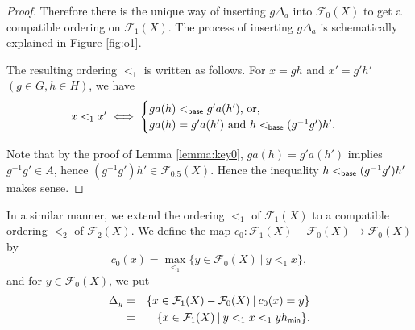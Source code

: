 \documentclass[10pt]{amsart}
\numberwithin{equation}{section}
\begin{document}
\begin{proof}
Therefore there is the unique way of inserting $g\Delta_{a}$ into ${\mathcal{F}}_{0}(X)$ to get a compatible ordering on ${\mathcal{F}}_{1}(X)$. The process of inserting $g\Delta_{a}$ is schematically explained in Figure \ref{fig:o1}.

The resulting ordering $<_{1}$ is written as follows. For $x = gh$ and $ x'=g'h'$ $(g \in G, h \in H)$, we have
\begin{gather}
\label{eqn:o1}
x <_{1} x' \iff 
\begin{cases}
ga(h) <_{\sf base} g'a(h') \text{, or,}\\
ga(h)=g'a(h') \text{ and } h <_{\sf base} (g^{-1}g')h'.
\end{cases}
\end{gather}

Note that by the proof of Lemma \ref{lemma:key0}, $ga(h)=g'a(h')$ implies $g^{-1}g' \in A$, hence $(g^{-1}g')h' \in {\mathcal{F}}_{0.5}(X)$. Hence the inequality $h <_{\sf base} (g^{-1}g')h'$ makes sense.

\end{proof}

In a similar manner, we extend the ordering $<_{1}$ of ${\mathcal{F}}_{1}(X)$ to a compatible ordering $<_{2}$ of ${\mathcal{F}}_{2}(X)$. We define the map $c_{0}: {\mathcal{F}}_{1}(X)-{\mathcal{F}}_{0}(X) \rightarrow {\mathcal{F}}_{0}(X)$ by 
\[ c_{0}(x)=\max_{<_{1}} \{ y \in {\mathcal{F}}_{0}(X) \: | \: y <_{1} x\}, \]
and for $y \in {\mathcal{F}}_{0}(X)$, we put 
\begin{eqnarray*}
\Delta_{y} & = &\{x \in {\mathcal{F}}_{1}(X)-{\mathcal{F}}_{0}(X) \: | \: c_{0}(x)=y\} \\
& = &\{x \in {\mathcal{F}}_{1}(X) \: | \: y <_{1} x <_{1} yh_{\sf min}\}.
\end{eqnarray*}
\end{document}
